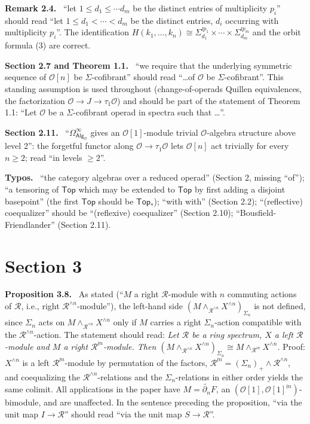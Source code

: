 \documentclass[12pt]{article}
\theoremstyle{plain}
\theoremstyle{definition}
\theoremstyle{remark}
\newcommand{\Cal}[1]{\mathcal{#1}}
\newcommand{\Alg}[1]{\mathsf{Alg}_{\mathcal{#1}}}
\newcommand{\Top}{\mathsf{Top}_*}
\newcommand{\corr}[1]{\par\smallskip\noindent\textbf{#1.}\ }
\begin{document}
\corr{Remark 2.4} ``let $1\leq d_1\leq\cdots d_m$ be the distinct entries of multiplicity $p_i$'' should read ``let $1\leq d_1<\cdots<d_m$ be the distinct entries, $d_i$ occurring with multiplicity $p_i$''. The identification $H(k_1,\dots,k_n)\cong\Sigma_{d_1}^{\wr p_1}\times\cdots\times\Sigma_{d_m}^{\wr p_m}$ and the orbit formula (3) are correct.

\corr{Section 2.7 and Theorem 1.1} ``we require that the underlying symmetric sequence of $\Cal O[n]$ be $\Sigma$-cofibrant'' should read ``\dots of $\Cal O$ be $\Sigma$-cofibrant''. This standing assumption is used throughout (change-of-operads Quillen equivalences, the factorization $\Cal O\to J\to\tau_1\Cal O$) and should be part of the statement of Theorem 1.1: ``Let $\Cal O$ be a $\Sigma$-cofibrant operad in spectra such that \dots''.

\corr{Section 2.11} ``$\Omega^\infty_{\Alg{O}}$ gives an $\Cal O[1]$-module trivial $\Cal O$-algebra structure above level 2'': the forgetful functor along $\Cal O\to\tau_1\Cal O$ lets $\Cal O[n]$ act trivially for every $n\geq2$; read ``in levels $\geq2$''.

\corr{Typos} ``the category algebras over a reduced operad'' (Section 2, missing ``of''); ``a tensoring of $\mathsf{Top}$ which may be extended to $\mathsf{Top}$ by first adding a disjoint basepoint'' (the first $\mathsf{Top}$ should be $\Top$); ``with with'' (Section 2.2); ``(reflective) coequalizer'' should be ``(reflexive) coequalizer'' (Section 2.10); ``Bousfield-Friendlander'' (Section 2.11).

\section*{Section 3}
\label{sec:s3}

\corr{Proposition 3.8} As stated (``$M$ a right $\Cal R$-module with $n$ commuting actions of $\Cal R$, i.e., right $\Cal R^{\wedge n}$-module''), the left-hand side $(M\wedge_{\Cal R^{\wedge n}}X^{\wedge n})_{\Sigma_n}$ is not defined, since $\Sigma_n$ acts on $M\wedge_{\Cal R^{\wedge n}}X^{\wedge n}$ only if $M$ carries a right $\Sigma_n$-action compatible with the $\Cal R^{\wedge n}$-action. The statement should read: \emph{Let $\Cal R$ be a ring spectrum, $X$ a left $\Cal R$-module and $M$ a right $\Cal R^{\wr n}$-module. Then $(M\wedge_{\Cal R^{\wedge n}}X^{\wedge n})_{\Sigma_n}\cong M\wedge_{\Cal R^{\wr n}}X^{\wedge n}$.} Proof: $X^{\wedge n}$ is a left $\Cal R^{\wr n}$-module by permutation of the factors, $\Cal R^{\wr n}=(\Sigma_n)_+\wedge\Cal R^{\wedge n}$, and coequalizing the $\Cal R^{\wedge n}$-relations and the $\Sigma_n$-relations in either order yields the same colimit. All applications in the paper have $M=\widetilde{\partial_n}F$, an $(\Cal O[1],\Cal O[1]^{\wr n})$-bimodule, and are unaffected. In the sentence preceding the proposition, ``via the unit map $I\to\Cal R$'' should read ``via the unit map $S\to\Cal R$''.
\end{document}
